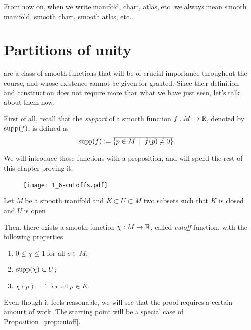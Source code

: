 \begin{tcolorbox}
From now on, when we write manifold, chart, atlas, etc. we always mean smooth manifold, smooth chart, smooth atlas, etc..
\end{tcolorbox}

\section{Partitions of unity}

 are a class of smooth functions that will be of crucial importance throughout the course, and whose existence cannot be given for granted.
Since their definition and construction does not require more than what we have just seen, let's talk about them now.

First of all, recall that the \emph{support} of a smooth function $f: M \to \mathbb{R}$, denoted by $\operatorname{supp}(f)$, is defined as
\begin{equation}
  \operatorname{supp}(f) := \overline{\{ p\in M \;\mid\; f(p) \neq 0\}}.
\end{equation}

We will introduce those functions with a proposition, and will spend the rest of this chapter proving it.

\begin{figure}[htp!]
  \texttt{[image: 1\_6-cutoffs.pdf]}
\end{figure}

\begin{prop}\label{prop:cutoff}
  Let $M$ be a smooth manifold and $K\subset U\subset M$ two subsets such that $K$ is closed and $U$ is open.
  
  Then, there exists a smooth function $\chi: M \to\mathbb{R}$, called \emph{cutoff} function, with the following properties
  \begin{enumerate}
    \item $0 \leq \chi \leq 1$ for all $p\in M$;
    \item $\operatorname{supp}(\chi)\subset U$;
    \item $\chi(p) = 1$ for all $p\in K$.
  \end{enumerate}
\end{prop}

Even though it feels reasonable, we will see that the proof requires a certain amount of work.
The starting point will be a special case of Proposition~\ref{prop:cutoff}.

